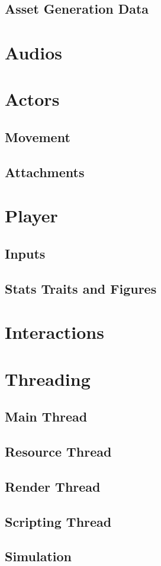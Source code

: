 \documentclass{report}
\begin{document}
\section{Asset Generation Data}


\chapter{Audios}


\chapter{Actors}

\section{Movement}

\section{Attachments}


\chapter{Player}

\section{Inputs}

\section{Stats Traits and Figures}


\chapter{Interactions}


\chapter{Threading}

\section{Main Thread}

\section{Resource Thread}

\section{Render Thread}

\section{Scripting Thread}

\section{Simulation}

\end{document}
